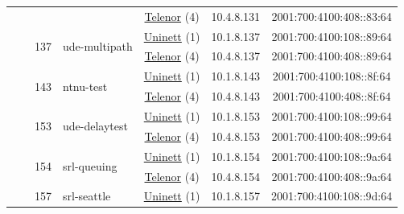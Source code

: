 \begin{small}
\begin{center}
\begin{longtable}{|c|c|c|c|c|c|c|c|}
  &  &  &  & \multicolumn{2}{|c|}{\tiny{\href{https://www.telenor.no}{Telenor} (4)}} & \tiny{10.4.8.131} & \tiny{2001:700:4100:408::83:64} \\* \cline{3-3}\cline{4-4}\cline{5-5}\cline{6-6}\cline{7-7}\cline{8-8}
  &  & \multirow{2}{*}{\tiny{137}} & \multicolumn{1}{|l|}{\multirow{2}{*}{\tiny{ude-multipath}}} & \multicolumn{2}{|c|}{\tiny{\href{https://www.uninett.no}{Uninett} (1)}} & \tiny{10.1.8.137} & \tiny{2001:700:4100:108::89:64} \\* \cline{5-5}\cline{6-6}\cline{7-7}\cline{8-8}
  &  &  &  & \multicolumn{2}{|c|}{\tiny{\href{https://www.telenor.no}{Telenor} (4)}} & \tiny{10.4.8.137} & \tiny{2001:700:4100:408::89:64} \\* \cline{3-3}\cline{4-4}\cline{5-5}\cline{6-6}\cline{7-7}\cline{8-8}
  &  & \multirow{2}{*}{\tiny{143}} & \multicolumn{1}{|l|}{\multirow{2}{*}{\tiny{ntnu-test}}} & \multicolumn{2}{|c|}{\tiny{\href{https://www.uninett.no}{Uninett} (1)}} & \tiny{10.1.8.143} & \tiny{2001:700:4100:108::8f:64} \\* \cline{5-5}\cline{6-6}\cline{7-7}\cline{8-8}
  &  &  &  & \multicolumn{2}{|c|}{\tiny{\href{https://www.telenor.no}{Telenor} (4)}} & \tiny{10.4.8.143} & \tiny{2001:700:4100:408::8f:64} \\* \cline{3-3}\cline{4-4}\cline{5-5}\cline{6-6}\cline{7-7}\cline{8-8}
  &  & \multirow{2}{*}{\tiny{153}} & \multicolumn{1}{|l|}{\multirow{2}{*}{\tiny{ude-delaytest}}} & \multicolumn{2}{|c|}{\tiny{\href{https://www.uninett.no}{Uninett} (1)}} & \tiny{10.1.8.153} & \tiny{2001:700:4100:108::99:64} \\* \cline{5-5}\cline{6-6}\cline{7-7}\cline{8-8}
  &  &  &  & \multicolumn{2}{|c|}{\tiny{\href{https://www.telenor.no}{Telenor} (4)}} & \tiny{10.4.8.153} & \tiny{2001:700:4100:408::99:64} \\* \cline{3-3}\cline{4-4}\cline{5-5}\cline{6-6}\cline{7-7}\cline{8-8}
  &  & \multirow{2}{*}{\tiny{154}} & \multicolumn{1}{|l|}{\multirow{2}{*}{\tiny{srl-queuing}}} & \multicolumn{2}{|c|}{\tiny{\href{https://www.uninett.no}{Uninett} (1)}} & \tiny{10.1.8.154} & \tiny{2001:700:4100:108::9a:64} \\* \cline{5-5}\cline{6-6}\cline{7-7}\cline{8-8}
  &  &  &  & \multicolumn{2}{|c|}{\tiny{\href{https://www.telenor.no}{Telenor} (4)}} & \tiny{10.4.8.154} & \tiny{2001:700:4100:408::9a:64} \\* \cline{3-3}\cline{4-4}\cline{5-5}\cline{6-6}\cline{7-7}\cline{8-8}
  &  & \multirow{2}{*}{\tiny{157}} & \multicolumn{1}{|l|}{\multirow{2}{*}{\tiny{srl-seattle}}} & \multicolumn{2}{|c|}{\tiny{\href{https://www.uninett.no}{Uninett} (1)}} & \tiny{10.1.8.157} & \tiny{2001:700:4100:108::9d:64} \\* \cline{5-5}\cline{6-6}\cline{7-7}\cline{8-8}

\end{longtable}
\end{center}
\end{small}
